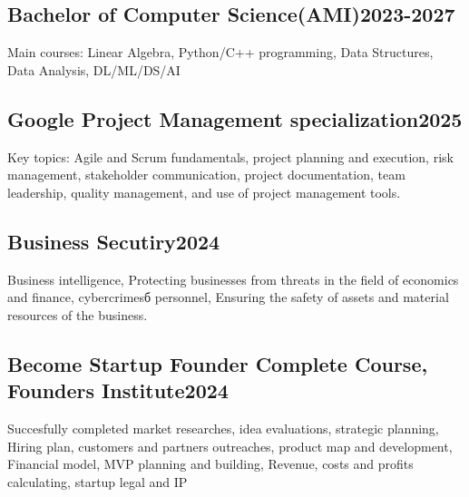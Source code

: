 \vspace*{10pt}

\subsection{{Bachelor of Computer Science(AMI)}\hfill 2023-2027}
\vspace*{5pt}
Main courses: Linear Algebra, Python/C++ programming, Data Structures, Data Analysis, DL/ML/DS/AI

\vspace*{10pt}

\subsection{Google Project Management specialization\hfill 2025}
\vspace*{5pt}
Key topics: Agile and Scrum fundamentals, project planning and execution, risk management, stakeholder communication, project documentation, team leadership, quality management, and use of project management tools. 

\vspace*{10pt}

\subsection{{Business Secutiry}\hfill 2024}
\vspace*{5pt}
Business intelligence, Protecting businesses from threats in the field of economics and finance, cybercrimesб personnel, Ensuring the safety of assets and material resources of the business.

\vspace*{10pt}

\subsection{{Become Startup Founder Complete Course, Founders Institute}\hfill 2024}
\vspace*{5pt}
Succesfully completed market researches, idea evaluations, strategic planning, Hiring plan, customers and partners outreaches, product map and development, Financial model, MVP planning and building, Revenue, costs and profits calculating, startup legal and IP

